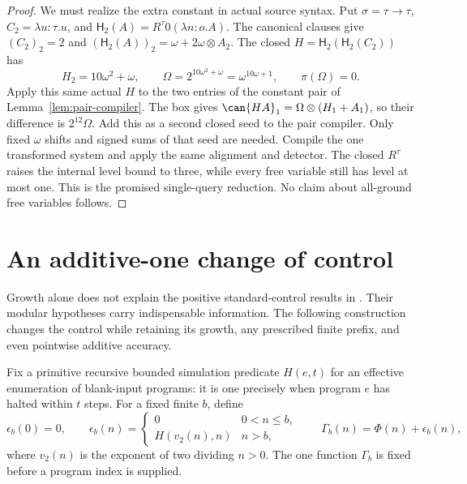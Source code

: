 \begin{proof}
We must realize the extra constant in actual source syntax.  Put
$\sigma=\tau\to\tau$, $C_2=\lambda u:\tau.u$, and
$\mathsf H_2(A)=R^\tau0(\lambda n:o.A)$.  The canonical clauses give
$(C_2)_2=2$ and $(\mathsf H_2(A))_2=\omega+2\omega\otimes A_2$.
The closed $H=\mathsf H_2(\mathsf H_2(C_2))$ has
\[
 H_2=10\omega^2+\omega,
 \qquad\Omega=2^{10\omega^2+\omega}=\omega^{10\omega+1},
 \qquad\pi(\Omega)=0.
\]
Apply this same actual $H$ to the two entries of the constant pair of
Lemma~\ref{lem:pair-compiler}.  The box gives
$\can{HA}_1=\Omega\otimes(H_1+A_1)$, so their difference is
$2^{12}\Omega$.  Add this as a second closed seed to the pair compiler.
Only fixed $\omega$ shifts and signed sums of that seed are needed.
Compile the one transformed system and apply the same alignment and detector.
The closed $R^\tau$ raises the internal level bound to three, while every
free variable still has level at most one.  This is the promised single-query
reduction.  No claim about all-ground free variables follows.
\end{proof}

\section{An additive-one change of control}\label{sec:control-hardness}

Growth alone does not explain the positive standard-control results in
\cite{wwmultivariate}.  Their modular hypotheses carry indispensable
information.  The following construction changes the control while retaining
its growth, any prescribed finite prefix, and even pointwise additive accuracy.

Fix a primitive recursive bounded simulation predicate $H(e,t)$ for an
effective enumeration of blank-input programs: it is one precisely when
program $e$ has halted within $t$ steps.  For a fixed finite $b$, define
\[
 \epsilon_b(0)=0,\qquad
 \epsilon_b(n)=
 \begin{cases}0&0<n\le b,\\H(v_2(n),n)&n>b,\end{cases}
 \qquad \Gamma_b(n)=\Phi(n)+\epsilon_b(n),
\]
where $v_2(n)$ is the exponent of two dividing $n>0$.
The one function $\Gamma_b$ is fixed before a program index is supplied.

